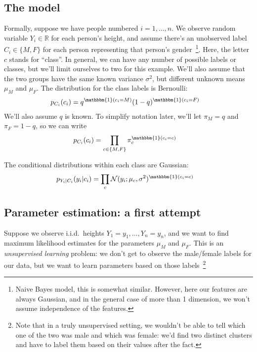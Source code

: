 \documentclass[12pt]{article}
\newcommand{\N}{\mathcal{N}}
\newcommand{\indicator}{\mathbbm{1}}
\begin{document}
    \subsection{The model}
    Formally, suppose we have people numbered $i=1, \ldots, n$. We observe
    random variable $Y_i \in \mathbb{R}$ for each person's height, and assume
    there's an unobserved label $C_i \in \{M, F\}$ for each person
    representing that person's gender~\footnote{%
        Naive Bayes model, this is somewhat similar. However, here our features
        are always Gaussian, and in the general case of more than 1 dimension,
    we won't assume independence of the features.}. Here, the letter $c$ stands
    for ``class''.  In general, we can have any number of possible labels or
    classes, but we'll limit ourselves to two for this example. We'll also
    assume that the two groups have the same known variance $\sigma^2$, but
    different unknown means $\mu_M$ and $\mu_F$.  The distribution for the
    class labels is Bernoulli:
    \begin{align*}
        p_{C_i}(c_i) &= q^{\indicator(c_i = M)}(1-q)^{\indicator(c_i = F)}
    \end{align*}
    We'll also assume $q$ is known. To simplify notation later, we'll let
    $\pi_M = q$ and $\pi_F = 1-q$, so we can write
    \begin{align}
        \label{eq:pc} p_{C_i}(c_i) &= \prod_{c \in \{M, F\}} \pi_c^{\indicator(c_i = c)}
    \end{align}

    The conditional distributions within each class are Gaussian:
    \begin{align}
        \label{eq:pygivenc} p_{Y_i|C_i}(y_i | c_i)
            &= \prod_{c} \N(y_i ; \mu_c , \sigma^2)^{\indicator(c_i = c)}
    \end{align}
    \subsection{Parameter estimation: a first attempt}
    \label{sec:parameter-estimation-attempt}
    Suppose we observe i.i.d.\ heights $Y_1 = y_1, \ldots, Y_n = y_n$, and we want to
    find maximum likelihood estimates for the parameters $\mu_M$ and $\mu_F$.
    This is an \emph{unsupervised learning} problem: we don't get to observe
    the male/female labels for our data, but we want to learn parameters based
    on those labels~\footnote{Note that in a truly unsupervised setting, we
        wouldn't be able to tell which one of the two was male and which was
        female: we'd find two distinct clusters and have to label them based on
        their values after the fact.}
\end{document}
